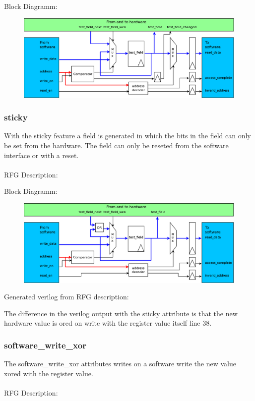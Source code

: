 \documentclass[12pt,a4paper]{article}
\begin{document}
Block Diagramm:
\begin{figure}[h!]
    \includegraphics[width=\textwidth]{pictures/Reg_changed}
\end{figure}
\newpage

\subsubsection{sticky}
With the sticky feature a field is generated in which the bits in the field can only be set from the hardware. The field can only be reseted from the software interface or with a reset.\\
\\
RFG Description:


Block Diagramm:
\begin{figure}[h!]
    \includegraphics[width=\textwidth]{pictures/Reg_hrw_srw_sticky.png}
\end{figure}
\newpage
Generated verilog from RFG description:

The difference in the verilog output with the sticky attribute is that the new hardware value is ored on write with the register value itself line 38.
\newpage

\subsubsection{software\_write\_xor}
The software\_write\_xor attributes writes on a software write the new value xored with the register value.\\
\\
RFG Description:

\end{document}
